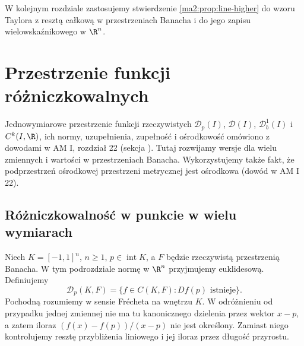 W kolejnym rozdziale zastosujemy stwierdzenie \ref{ma2:prop:line-higher}
do wzoru Taylora z resztą całkową w przestrzeniach Banacha
i do jego zapisu wielowskaźnikowego w $\R^n$.


\section{Przestrzenie funkcji różniczkowalnych}
\label{ma2:sec:differentiable-spaces}

Jednowymiarowe przestrzenie funkcji rzeczywistych
$\mathcal D_p(I)$, $\mathcal D(I)$,
$\mathcal D_b^1(I)$ i $C^k(I,\R)$, ich normy,
uzupełnienia, zupełność i ośrodkowość omówiono
z dowodami w AM I, rozdział 22 (sekcja
).
Tutaj rozwijamy wersje dla wielu zmiennych i wartości
w przestrzeniach Banacha. Wykorzystujemy także
fakt, że podprzestrzeń ośrodkowej przestrzeni
metrycznej jest ośrodkowa (dowód w AM I 22).

\subsection{Różniczkowalność w punkcie w wielu wymiarach}

Niech $K=[-1,1]^n$, $n\ge1$, $p\in\operatorname{int}K$,
a $F$ będzie rzeczywistą przestrzenią Banacha.
W tym podrozdziale normę w $\R^n$ przyjmujemy
euklidesową. Definiujemy
\[
 \mathcal D_p(K,F)=
 \{f\in C(K,F):Df(p)\text{ istnieje}\}.
\]
Pochodną rozumiemy w sensie Frécheta na wnętrzu $K$.
W odróżnieniu od przypadku jednej zmiennej
nie ma tu kanonicznego dzielenia przez wektor
$x-p$, a zatem iloraz $(f(x)-f(p))/(x-p)$
nie jest określony.
Zamiast niego kontrolujemy resztę przybliżenia
liniowego i jej iloraz przez długość przyrostu.

